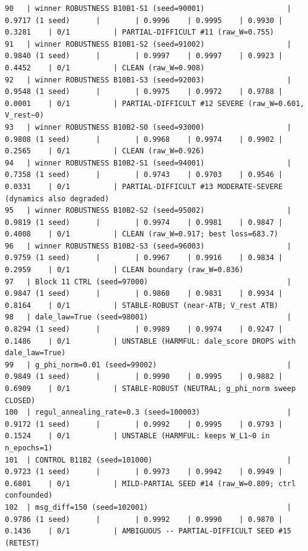 \begin{tiny}
\begin{verbatim}
90   | winner ROBUSTNESS B10B1-S1 (seed=90001)                   | 0.9717 (1 seed)      |        | 0.9996    | 0.9995    | 0.9930 | 0.3281    | 0/1          | PARTIAL-DIFFICULT #11 (raw_W=0.755)
91   | winner ROBUSTNESS B10B1-S2 (seed=91002)                   | 0.9840 (1 seed)      |        | 0.9997    | 0.9997    | 0.9923 | 0.4452    | 0/1          | CLEAN (raw_W=0.908)
92   | winner ROBUSTNESS B10B1-S3 (seed=92003)                   | 0.9548 (1 seed)      |        | 0.9975    | 0.9972    | 0.9788 | 0.0001    | 0/1          | PARTIAL-DIFFICULT #12 SEVERE (raw_W=0.601, V_rest~0)
93   | winner ROBUSTNESS B10B2-S0 (seed=93000)                   | 0.9808 (1 seed)      |        | 0.9968    | 0.9974    | 0.9902 | 0.2565    | 0/1          | CLEAN (raw_W=0.926)
94   | winner ROBUSTNESS B10B2-S1 (seed=94001)                   | 0.7358 (1 seed)      |        | 0.9743    | 0.9703    | 0.9546 | 0.0331    | 0/1          | PARTIAL-DIFFICULT #13 MODERATE-SEVERE (dynamics also degraded)
95   | winner ROBUSTNESS B10B2-S2 (seed=95002)                   | 0.9819 (1 seed)      |        | 0.9974    | 0.9981    | 0.9847 | 0.4008    | 0/1          | CLEAN (raw_W=0.917; best loss=683.7)
96   | winner ROBUSTNESS B10B2-S3 (seed=96003)                   | 0.9759 (1 seed)      |        | 0.9967    | 0.9916    | 0.9834 | 0.2959    | 0/1          | CLEAN boundary (raw_W=0.836)
97   | Block 11 CTRL (seed=97000)                                | 0.9847 (1 seed)      |        | 0.9860    | 0.9831    | 0.9934 | 0.8164    | 0/1          | STABLE-ROBUST (near-ATB; V_rest ATB)
98   | dale_law=True (seed=98001)                                | 0.8294 (1 seed)      |        | 0.9989    | 0.9974    | 0.9247 | 0.1486    | 0/1          | UNSTABLE (HARMFUL: dale_score DROPS with dale_law=True)
99   | g_phi_norm=0.01 (seed=99002)                              | 0.9849 (1 seed)      |        | 0.9990    | 0.9995    | 0.9882 | 0.6909    | 0/1          | STABLE-ROBUST (NEUTRAL; g_phi_norm sweep CLOSED)
100  | regul_annealing_rate=0.3 (seed=100003)                    | 0.9172 (1 seed)      |        | 0.9992    | 0.9995    | 0.9793 | 0.1524    | 0/1          | UNSTABLE (HARMFUL: keeps W_L1~0 in n_epochs=1)
101  | CONTROL B11B2 (seed=101000)                               | 0.9723 (1 seed)      |        | 0.9973    | 0.9942    | 0.9949 | 0.6801    | 0/1          | MILD-PARTIAL SEED #14 (raw_W=0.809; ctrl confounded)
102  | msg_diff=150 (seed=102001)                                | 0.9786 (1 seed)      |        | 0.9992    | 0.9990    | 0.9870 | 0.1436    | 0/1          | AMBIGUOUS -- PARTIAL-DIFFICULT SEED #15 (RETEST)

\end{verbatim}
\end{tiny}
